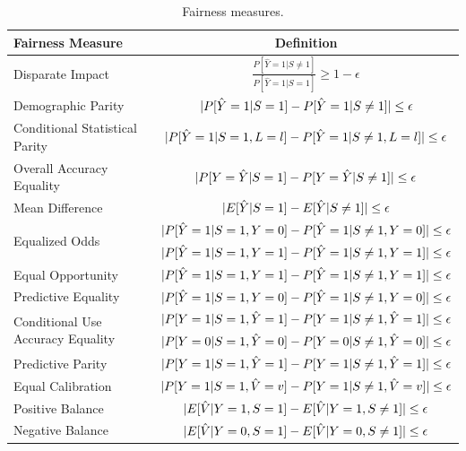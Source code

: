 \documentclass[conference]{IEEEtran}
\begin{document}
\begin{table}[h]
    \centering
    \begin{tabular}{|l|c|} %
        \hline
        \textbf{Fairness Measure} & \textbf{Definition} \\
        \hline
Disparate Impact & $\frac{P[\hat{Y} = 1 | S \neq 1]}{P[\hat{Y} = 1 | S = 1]} \geq 1 - \epsilon$ \\
\hline
Demographic Parity & $\lvert P[\hat{Y} = 1 | S = 1] - P[\hat{Y} = 1 | S \neq 1]\rvert \leq \epsilon$ \\
\hline
Conditional Statistical Parity & $\lvert P[\hat{Y} = 1 | S = 1, L = l] - P[\hat{Y} = 1 | S \neq 1, L = l]\rvert \leq \epsilon$ \\
\hline
Overall Accuracy Equality & $\lvert P[Y = \hat{Y} | S = 1] - P[Y = \hat{Y} | S \neq 1]\rvert \leq \epsilon$ \\
\hline
Mean Difference & $\lvert E[\hat{Y}|S = 1] - E[\hat{Y}|S \neq 1]\rvert \leq \epsilon$ \\
\hline
\multirow{2}{*}{Equalized Odds} & $\lvert P[\hat{Y} = 1 | S = 1, Y = 0] - P[\hat{Y} = 1 | S \neq 1, Y = 0]\rvert \leq \epsilon$ \\
\cline{2-2}
                                & $\lvert P[\hat{Y} = 1 | S = 1, Y = 1] - P[\hat{Y} = 1 | S \neq 1, Y = 1]\rvert \leq \epsilon$ \\
\hline
Equal Opportunity & $\lvert P[\hat{Y} = 1 | S = 1, Y = 1] - P[\hat{Y} = 1 | S \neq 1, Y = 1]\rvert \leq \epsilon$ \\
\hline
Predictive Equality & $\lvert P[\hat{Y} = 1 | S = 1, Y = 0] - P[\hat{Y} = 1 | S \neq 1, Y = 0]\rvert \leq \epsilon$ \\
\hline
\multirow{2}{*}{Conditional Use Accuracy Equality} & $\lvert P[Y = 1 | S = 1, \hat{Y} = 1] - P[Y = 1 | S \neq 1, \hat{Y} = 1]\rvert \leq \epsilon$ \\
\cline{2-2}
                                 & $\lvert P[Y = 0 | S = 1, \hat{Y} = 0] - P[Y = 0 | S \neq 1, \hat{Y} = 0]\rvert \leq \epsilon$ \\
\hline
Predictive Parity & $\lvert P[Y = 1 | S = 1, \hat{Y} = 1] - P[Y = 1 | S \neq 1, \hat{Y} = 1]\rvert \leq \epsilon$ \\
\hline
Equal Calibration & $\lvert P[Y = 1 | S = 1, \hat{V} = v] - P[Y = 1 | S \neq 1, \hat{V} = v]\rvert \leq \epsilon$ \\
\hline
Positive Balance & $\lvert E[\hat{V} | Y = 1, S = 1] - E[\hat{V} | Y = 1, S \neq 1]\rvert \leq \epsilon$ \\
\hline
Negative Balance & $\lvert E[\hat{V} | Y = 0, S = 1] - E[\hat{V} | Y = 0, S \neq 1]\rvert \leq \epsilon$ \\
\hline
    \end{tabular}
    \caption{Fairness measures.}
    \label{tab:measures}
\end{table}
\end{document}

